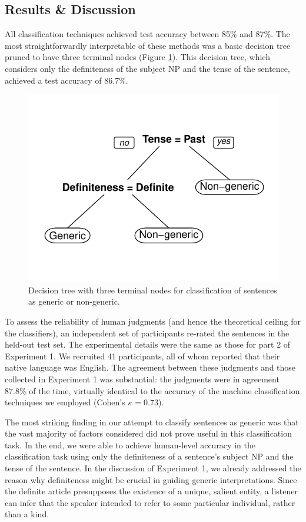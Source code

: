 \documentclass[10pt,letterpaper]{article}
\begin{document}
\subsection{Results \& Discussion}

All classification techniques achieved test accuracy between 85\% and 87\%. The most straightforwardly interpretable of these methods was a basic decision tree pruned to have three terminal nodes (Figure \ref{fig:tree}). This decision tree, which considers only the definiteness of the subject NP and the tense of the sentence, achieved a test accuracy of 86.7\%.

\begin{figure}[t]
\centering
\includegraphics[width=.8\linewidth]{figures/tree.pdf}
\caption{\label{fig:tree} Decision tree with three terminal nodes for classification of sentences as generic or non-generic.}
\end{figure}

To assess the reliability of human judgments (and hence the theoretical ceiling for the classifiers), an independent set of participants re-rated the sentences in the held-out test set. The experimental details were the same as those for part 2 of Experiment 1. We recruited 41 participants, all of whom reported that their native language was English. The agreement between these judgments and those collected in Experiment 1 was substantial: the judgments were in agreement 87.8\% of the time, virtually identical to the accuracy of the machine classification techniques we employed (Cohen's \(\kappa = 0.73\)).

The most striking finding in our attempt to classify sentences as generic was that the vast majority of factors considered did not prove useful in this classification task. In the end, we were able to achieve human-level accuracy in the classification task using only the definiteness of a sentence's subject NP and the tense of the sentence. In the discussion of Experiment 1, we already addressed the reason why definiteness might be crucial in guiding generic interpretations. Since the definite article presupposes the existence of a unique, salient entity, a listener can infer that the speaker intended to refer to some particular individual, rather than a kind.
\end{document}
